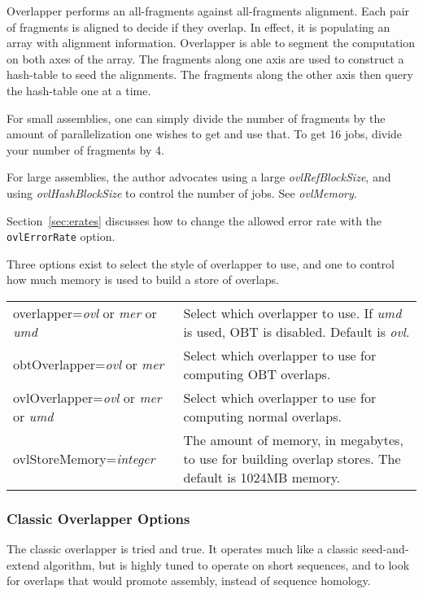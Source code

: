 \documentclass[twoside,11pt]{article}
\begin{document}
Overlapper performs an all-fragments against all-fragments alignment.
Each pair of fragments is aligned to decide if they overlap.  In
effect, it is populating an array with alignment information.
Overlapper is able to segment the computation on both axes of the
array.  The fragments along one axis are used to construct a
hash-table to seed the alignments.  The fragments along the other axis
then query the hash-table one at a time.

For small assemblies, one can simply divide the number of fragments by
the amount of parallelization one wishes to get and use that.  To get
16 jobs, divide your number of fragments by 4.

For large assemblies, the author advocates using a large {\it
ovlRefBlockSize}, and using {\it ovlHashBlockSize} to control the number of
jobs.  See {\it ovlMemory}.

Section~\ref{sec:erates} discusses how to change the allowed error rate with
the {\tt ovlErrorRate} option.

Three options exist to select the style of overlapper to use, and one to
control how much memory is used to build a store of overlaps.

\begin{longtable}{lp{3.0in}}
overlapper={\em ovl} or {\em mer} or {\em umd} &
Select which overlapper to use.
If {\em umd} is used, OBT is disabled.
Default is {\em ovl}.
\\

obtOverlapper={\em ovl} or {\em mer} &
Select which overlapper to use for computing OBT overlaps.
\\

ovlOverlapper={\em ovl} or {\em mer} or {\em umd} &
Select which overlapper to use for computing normal overlaps.
\\

ovlStoreMemory={\it integer} &
The amount of memory, in megabytes, to use for building overlap
stores.  The default is 1024MB memory.
\\
\end{longtable}

\subsubsection{Classic Overlapper Options}

The classic overlapper is tried and true.  It operates much like a
classic seed-and-extend algorithm, but is highly tuned to operate on
short sequences, and to look for overlaps that would promote assembly,
instead of sequence homology.
\end{document}
